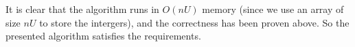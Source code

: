\documentclass{article}
\begin{document}
\begin{algorithm}
\caption{$knapsack(n, C, U)$}\label{alg:cap}
\begin{algorithmic}
  
\end{algorithmic}
\end{algorithm}

It is clear that the algorithm runs in $O(nU)$ memory (since we use an array of size $nU$ to store the intergers), and the correctness has been proven above. So the presented algorithm satisfies the requirements.
\end{document}
